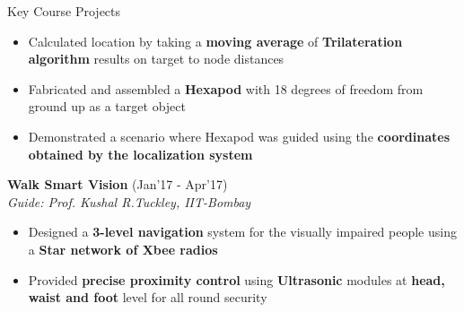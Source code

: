 \documentclass{resume}
\newcommand{\sepval}{-0.5em}
\begin{document}
\begin{rSection}{Key Course Projects}
\begin{itemize}[leftmargin=*]
	\item Calculated location by taking a {\bf moving average} of {\bf Trilateration algorithm} results on target to node distances

	\item Fabricated and assembled a {\bf Hexapod} with 18 degrees of freedom from ground up as a target object

	\item Demonstrated a scenario where Hexapod was guided using the {\bf coordinates obtained by the localization system}

\end{itemize}

%
%
%  
%
%  	
%  	
% 

\item {\bf Walk Smart Vision} \hfill {(Jan'17 - Apr'17)}\\

\emph{Guide: Prof. Kushal R.Tuckley, IIT-Bombay}\\ 
[-0.6cm]

\begin{itemize}[leftmargin=*]

	\itemsep \sepval

	\item Designed a {\bf 3-level navigation} system for the visually impaired people using a {\bf Star network of Xbee radios}


	\item Provided {\bf precise proximity control} using {\bf Ultrasonic} modules at {\bf head, waist and foot} level for all round security


\end{itemize}
\end{rSection}
\end{document}
